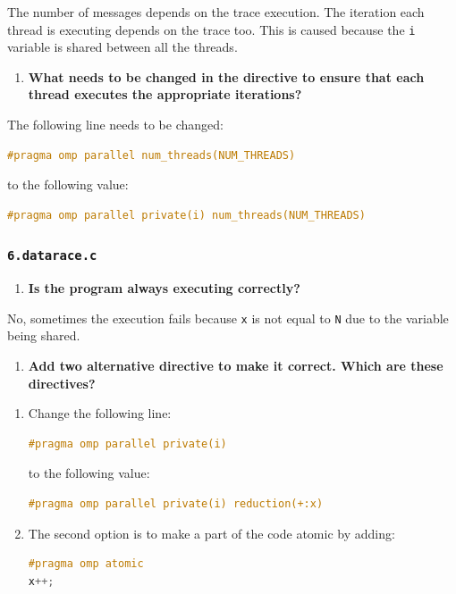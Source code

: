 \documentclass[a4paper]{article}
\begin{document}
The number of messages depends on the trace execution. The iteration each thread is executing depends on the trace too. This is caused because the \verb|i| variable is shared between all the threads.

\begin{enumerate}[resume]
	\item \textbf{What needs to be changed in the directive to ensure that each thread executes the appropriate iterations?}
\end{enumerate}

The following line needs to be changed:
\begin{lstlisting}[language=C]
#pragma omp parallel num_threads(NUM_THREADS)
\end{lstlisting}

to the following value:
\begin{lstlisting}[language=C]
#pragma omp parallel private(i) num_threads(NUM_THREADS)
\end{lstlisting}

\subsubsection{\texttt{6.datarace.c}}
\begin{enumerate}
	\item \textbf{Is the program always executing correctly?}
\end{enumerate}

No, sometimes the execution fails because \verb|x| is not equal to \verb|N| due to the variable being shared.

\begin{enumerate}[resume]
	\item \textbf{Add two alternative directive to make it correct. Which are these directives?}
\end{enumerate}

\begin{enumerate}[label=\roman*)]
	\item Change the following line:
	\begin{lstlisting}[language=C]
#pragma omp parallel private(i)
	\end{lstlisting}
	
	to the following value:
	\begin{lstlisting}[language=C]
#pragma omp parallel private(i) reduction(+:x)
	\end{lstlisting}
	
	\item The second option is to make a part of the code atomic by adding:
	\begin{lstlisting}[language=C]
#pragma omp atomic
x++;
	\end{lstlisting}
\end{enumerate}
\end{document}

